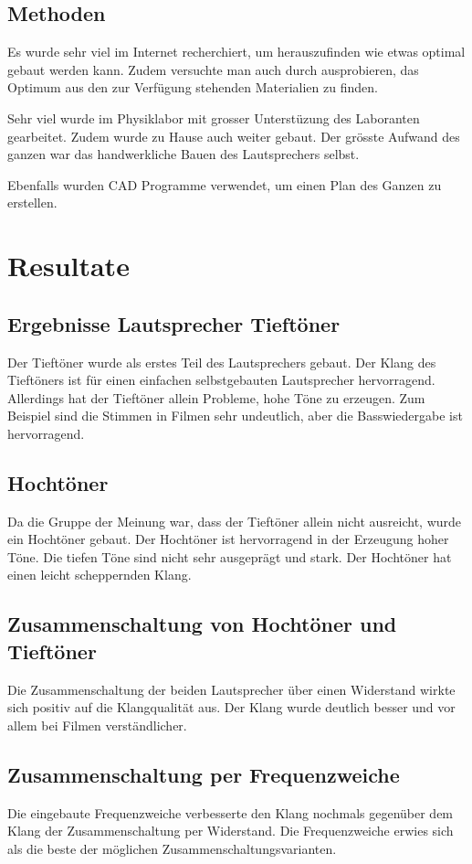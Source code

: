 \documentclass[a4paper,11pt]{report}
\begin{document}
\section{Methoden}
Es wurde sehr viel im Internet recherchiert, um herauszufinden wie etwas optimal gebaut werden kann. Zudem versuchte man auch durch ausprobieren, das Optimum aus den zur Verfügung stehenden Materialien zu finden.

Sehr viel wurde im Physiklabor mit grosser Unterstüzung des Laboranten gearbeitet. Zudem wurde zu Hause auch weiter gebaut. Der grösste Aufwand des ganzen war das handwerkliche Bauen des Lautsprechers selbst.

Ebenfalls wurden CAD Programme verwendet, um einen Plan des Ganzen zu erstellen.
\chapter{Resultate}

\section{Ergebnisse Lautsprecher Tieftöner}
Der Tieftöner wurde als erstes Teil des Lautsprechers gebaut. Der Klang des Tieftöners ist für einen einfachen selbstgebauten Lautsprecher hervorragend. Allerdings hat der Tieftöner allein Probleme, hohe Töne zu erzeugen. Zum Beispiel sind die Stimmen in Filmen sehr undeutlich, aber die Basswiedergabe ist hervorragend.

\section{Hochtöner}
Da die Gruppe der Meinung war, dass der Tieftöner allein nicht ausreicht, wurde ein Hochtöner gebaut. Der Hochtöner ist hervorragend in der Erzeugung hoher Töne. Die tiefen Töne sind nicht sehr ausgeprägt und stark. Der Hochtöner hat einen leicht scheppernden Klang. 

\section{Zusammenschaltung von Hochtöner und Tieftöner}
Die Zusammenschaltung der beiden Lautsprecher über einen Widerstand wirkte sich positiv auf die Klangqualität aus. Der Klang wurde deutlich besser und vor allem bei Filmen verständlicher.

\section{Zusammenschaltung per Frequenzweiche}
Die eingebaute Frequenzweiche verbesserte den Klang nochmals gegenüber dem Klang der Zusammenschaltung per Widerstand. Die Frequenzweiche erwies sich als die beste der möglichen Zusammenschaltungsvarianten.
\end{document}
